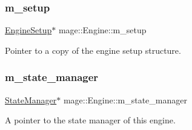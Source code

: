 \subsubsection{\texorpdfstring{m\+\_\+setup}{m\_setup}}
{\footnotesize\ttfamily \hyperlink{structmage_1_1_engine_setup}{Engine\+Setup}$\ast$ mage\+::\+Engine\+::m\+\_\+setup\hspace{0.3cm}{\ttfamily [private]}}

Pointer to a copy of the engine setup structure. \hypertarget{classmage_1_1_engine_a7a0c463c67c3375b896809be9046113d}{}\label{classmage_1_1_engine_a7a0c463c67c3375b896809be9046113d} 
\subsubsection{\texorpdfstring{m\+\_\+state\+\_\+manager}{m\_state\_manager}}
{\footnotesize\ttfamily \hyperlink{classmage_1_1_state_manager}{State\+Manager}$\ast$ mage\+::\+Engine\+::m\+\_\+state\+\_\+manager\hspace{0.3cm}{\ttfamily [private]}}

A pointer to the state manager of this engine. 